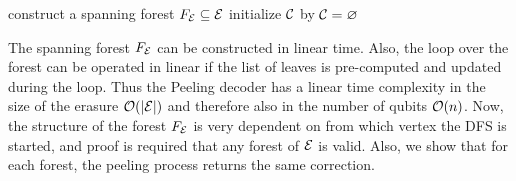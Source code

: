 \begin{algo}[algotitle=Peeling decoder (adapted from \cite{delfosse2017linear}), label=algo:peel]
  \begin{algorithm}[H]
    \BlankLine
    construct a spanning forest $F_{\mathcal{E}} \subseteq\mathcal{E}$\;
    initialize $\mathcal{C}$ by $\mathcal{C} = {\varnothing}$\;
  \end{algorithm}
\end{algo}
The spanning forest $F_{\mathcal{E}}$ can be constructed in linear time. Also, the loop over the forest can be operated in linear if the list of leaves is pre-computed and updated during the loop. Thus the Peeling decoder has a linear time complexity in the size of the erasure $\mathcal{O}(\abs{\mathcal{E}})$ and therefore also in the number of qubits $\mathcal{O}(n)$. Now, the structure of the forest $F_{\mathcal{E}}$ is very dependent on from which vertex the DFS is started, and proof is required that any forest of $\mathcal{E}$ is valid. Also, we show that for each forest, the peeling process returns the same correction.

